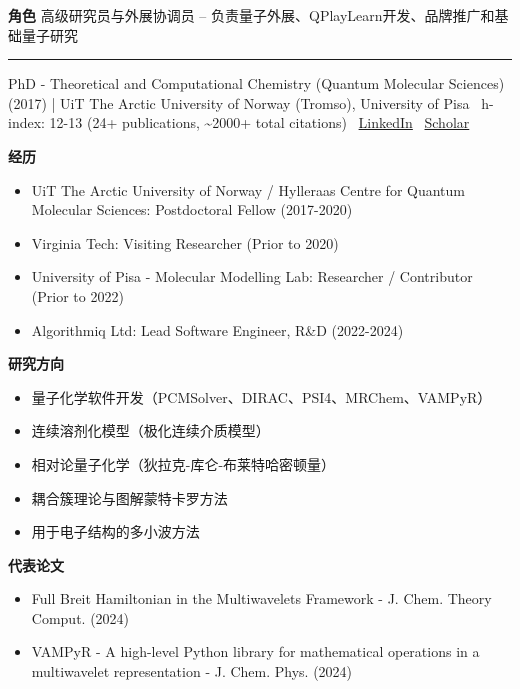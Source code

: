 \par{\footnotesize\color{mainred}\textbf{角色}} {\footnotesize 高级研究员与外展协调员 -- 负责量子外展、QPlayLearn开发、品牌推广和基础量子研究}
\vspace{2pt}\hrule\vspace{2pt}
\vspace{4pt}
\par{\footnotesize\color{graytext}PhD - Theoretical and Computational Chemistry (Quantum Molecular Sciences) (2017) | UiT The Arctic University of Norway (Tromso), University of Pisa \textbar\  h-index: 12-13 (24+ publications, \textasciitilde{}2000+ total citations) \textbar\  \href{https://www.linkedin.com/in/robertodr/}{LinkedIn} \textbar\  \href{https://scholar.google.com.tr/citations?user=G015fgsAAAAJ}{Scholar}}
\par{\footnotesize\color{mainred}\textbf{经历}}
\begin{itemize}[leftmargin=1.2em,itemsep=0pt,topsep=0pt]
\item {\footnotesize UiT The Arctic University of Norway / Hylleraas Centre for Quantum Molecular Sciences: Postdoctoral Fellow (2017-2020)}
\item {\footnotesize Virginia Tech: Visiting Researcher (Prior to 2020)}
\item {\footnotesize University of Pisa - Molecular Modelling Lab: Researcher / Contributor (Prior to 2022)}
\item {\footnotesize Algorithmiq Ltd: Lead Software Engineer, R\&D (2022-2024)}
\end{itemize}
\par{\footnotesize\color{mainred}\textbf{研究方向}}
\begin{itemize}[leftmargin=1.2em,itemsep=0pt,topsep=0pt]
\item {\footnotesize 量子化学软件开发（PCMSolver、DIRAC、PSI4、MRChem、VAMPyR）}
\item {\footnotesize 连续溶剂化模型（极化连续介质模型）}
\item {\footnotesize 相对论量子化学（狄拉克-库仑-布莱特哈密顿量）}
\item {\footnotesize 耦合簇理论与图解蒙特卡罗方法}
\item {\footnotesize 用于电子结构的多小波方法}
\end{itemize}
\par{\footnotesize\color{mainred}\textbf{代表论文}}
\begin{itemize}[leftmargin=1.2em,itemsep=0pt,topsep=0pt]
\item {\footnotesize Full Breit Hamiltonian in the Multiwavelets Framework - J. Chem. Theory Comput. (2024)}
\item {\footnotesize VAMPyR - A high-level Python library for mathematical operations in a multiwavelet representation - J. Chem. Phys. (2024)}
\end{itemize}

